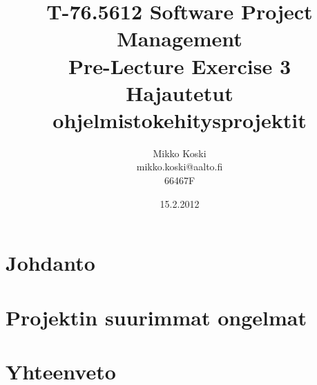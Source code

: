 \documentclass[a4paper]{article}
\begin{document}
\title{\small T-76.5612 Software Project Management \\ Pre-Lecture Exercise 3 \\ \huge Hajautetut ohjelmistokehitysprojektit}
\date{15.2.2012}
\author{Mikko Koski \\ mikko.koski@aalto.fi \\ 66467F}
\maketitle

\normalsize

\section{Johdanto}

\section{Projektin suurimmat ongelmat}

% 

\section{Yhteenveto}
\end{document}
